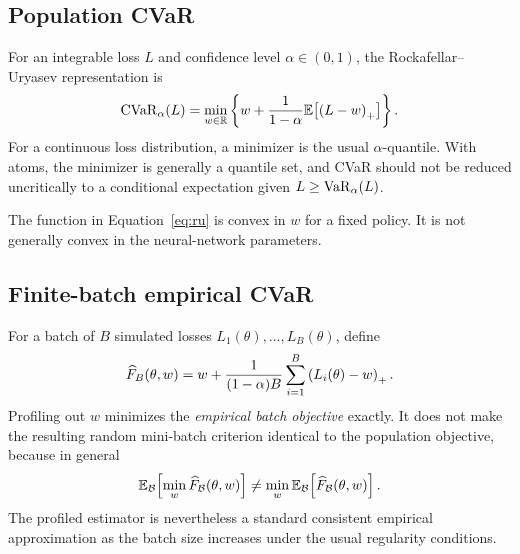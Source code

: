 \subsection{Population CVaR}

For an integrable loss $L$ and confidence level $\alpha\in(0,1)$, the
Rockafellar--Uryasev representation is
\begin{equation}
  \operatorname{CVaR}_{\alpha}(L)
  =\min_{w\in\mathbb{R}}
  \left\{
    w+\frac{1}{1-\alpha}\mathbb{E}\!\left[\left(L-w\right)_{+}\right]
  \right\}.
  \label{eq:ru}
\end{equation}
For a continuous loss distribution, a minimizer is the usual
$\alpha$-quantile. With atoms, the minimizer is generally a quantile set, and
CVaR should not be reduced uncritically to a conditional expectation given
$L\geq\operatorname{VaR}_{\alpha}(L)$.

The function in Equation~\eqref{eq:ru} is convex in $w$ for a fixed policy. It
is not generally convex in the neural-network parameters.

\subsection{Finite-batch empirical CVaR}

For a batch of $B$ simulated losses $L_1(\theta),\ldots,L_B(\theta)$, define
\begin{equation}
  \widehat F_B(\theta,w)
  =w+\frac{1}{(1-\alpha)B}
  \sum_{i=1}^{B}\left(L_i(\theta)-w\right)_{+}.
  \label{eq:emp_ru}
\end{equation}
Profiling out $w$ minimizes the \emph{empirical batch objective} exactly. It
does not make the resulting random mini-batch criterion identical to the
population objective, because in general
\[
  \mathbb{E}_{\mathcal B}\!\left[\min_w\widehat F_{\mathcal B}(\theta,w)\right]
  \neq
  \min_w\mathbb{E}_{\mathcal B}\!\left[\widehat F_{\mathcal B}(\theta,w)\right].
\]
The profiled estimator is nevertheless a standard consistent empirical
approximation as the batch size increases under the usual regularity
conditions.


